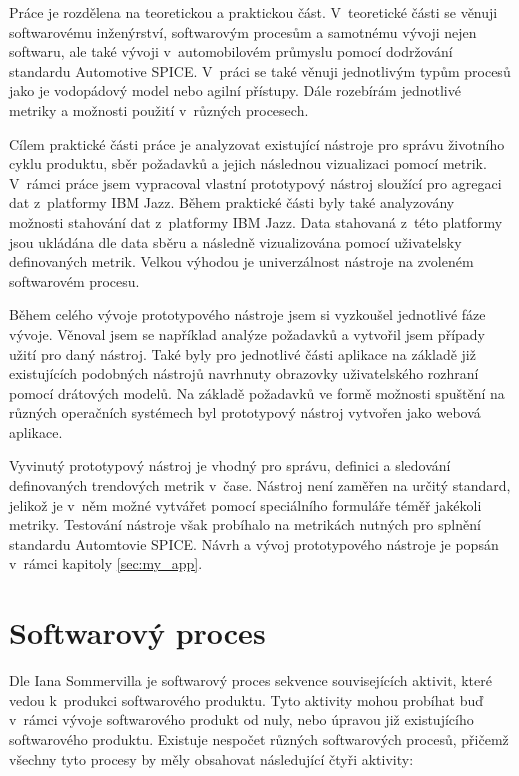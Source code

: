 \documentclass[czech,master]{diploma}
\begin{document}
Práce je rozdělena na teoretickou a praktickou část. V~teoretické části se věnuji softwarovému inženýrství, softwarovým procesům a samotnému vývoji nejen softwaru, ale také vývoji v~automobilovém průmyslu pomocí dodržování standardu Automotive SPICE. V~práci se také věnuji jednotlivým typům procesů jako je vodopádový model nebo agilní přístupy. Dále rozebírám jednotlivé metriky a možnosti použití v~různých procesech.

Cílem praktické části práce je analyzovat existující nástroje pro správu životního cyklu produktu, sběr požadavků a jejich následnou vizualizaci pomocí metrik. V~rámci práce jsem vypracoval vlastní prototypový nástroj sloužící pro agregaci dat z~platformy IBM Jazz. Během praktické části byly také analyzovány možnosti stahování dat z~platformy IBM Jazz. Data stahovaná z~této platformy jsou ukládána dle data sběru a následně vizualizována pomocí uživatelsky definovaných metrik. Velkou výhodou je univerzálnost nástroje na zvoleném softwarovém procesu.

Během celého vývoje prototypového nástroje jsem si vyzkoušel jednotlivé fáze vývoje. Věnoval jsem se například analýze požadavků a vytvořil jsem případy užití pro daný nástroj. Také byly pro jednotlivé části aplikace na základě již existujících podobných nástrojů navrhnuty obrazovky uživatelského rozhraní pomocí drátových modelů. Na základě požadavků ve formě možnosti spuštění na různých operačních systémech byl prototypový nástroj vytvořen jako webová aplikace.

Vyvinutý prototypový nástroj je vhodný pro správu, definici a sledování definovaných trendových metrik v~čase. Nástroj není zaměřen na určitý standard, jelikož je v~něm možné vytvářet pomocí speciálního formuláře téměř jakékoli metriky. Testování nástroje však probíhalo na metrikách nutných pro splnění standardu Automtovie SPICE. Návrh a vývoj prototypového nástroje je popsán v~rámci kapitoly \ref{sec:my_app}.

\chapter{Softwarový proces}
\label{sec:sw_process}

Dle Iana Sommervilla \cite{ref:sommerrville_sw_process} je softwarový proces sekvence souvisejících aktivit, které vedou k~produkci softwarového produktu. Tyto aktivity mohou probíhat buď v~rámci vývoje softwarového produkt od nuly, nebo úpravou již existujícího softwarového produktu. Existuje nespočet různých softwarových procesů, přičemž všechny tyto procesy by měly obsahovat následující čtyři aktivity:
\end{document}
